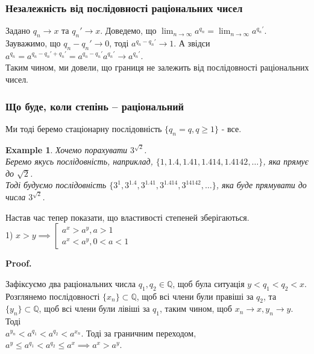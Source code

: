 \documentclass[a4paper, 14pt]{article}
\makeatletter
\def\qed{$\blacksquare$}
\theoremstyle{theoremdd}
\theoremstyle{theoremdd}
\theoremstyle{theoremdd}
\theoremstyle{theoremdd}
\newtheorem{example}[theorem]{Example}
\theoremstyle{theoremdd}
\theoremstyle{theoremdd}
\theoremstyle{theoremdd}
\theoremstyle{theoremdd}
\renewenvironment{proof}[1][Proof.\\]{\par
\pushQED{\hfill \qed}%
\normalfont \topsep6\p@\@plus6\p@\relax
\trivlist
\item\relax
{\bfseries
#1\@addpunct{.}}\hspace\labelsep\ignorespaces
}{%
\popQED\endtrivlist\@endpefalse
}
\makeatother
\begin{document}
\subsubsection*{Незалежність від послідовності раціональних чисел}
Задано $q_n \to x$ та $q_n' \to x$. Доведемо, що $\displaystyle\lim_{n \to \infty} a^{q_n} = \displaystyle\lim_{n \to \infty} a^{q_n'}$.\\
\iffalse
Зауважимо, що $q_n - q_n' \to 0$, тоді для $\varepsilon = 1: \exists N: \forall n \geq N: |q_n-q_n'| < 1$.\\
Тоді $|a^{q_n} - a^{q_n'}| = a^{q_n'}|a^{q_n-q_n'}-1| \leq a^{q_n'} 2|q_n-q_n'|(a-1) \overset{n \to \infty}{\longrightarrow} 0$.\\
Отже, дійсно,  $\displaystyle\lim_{n \to \infty} a^{q_n} = \displaystyle\lim_{n \to \infty} a^{q_n'}$, що підтверджує незалежність.
\fi
Зауважимо, що $q_n - q_n' \to 0$, тоді $a^{q_n - q_n'} \to 1$. А звідси $a^{q_n} = a^{q_n - q_n' + q_n'} = a^{q_n - q_n'} a^{q_n'} \to a^{q_n'}$.\\
Таким чином, ми довели, що границя не залежить від послідовності раціональних чисел.

\subsubsection*{Що буде, коли степінь -- раціональний}
Ми тоді беремо стаціонарну послідовність $\{q_n = q, q \geq 1\}$ - все.

\begin{example}
Хочемо порахувати $3^{\sqrt{2}}$. \\ Беремо якусь послідовність, наприклад, $\{1,1.4,1.41,1.414,1.4142,\dots\}$, яка прямує до $\sqrt{2}$.\\
Тоді будуємо послідовність $\{3^1,3^{1.4},3^{1.41},3^{1.414},3^{14142},\dots\}$, яка буде прямувати до числа $3^{\sqrt{2}}$.
\\
\end{example}

Настав час тепер показати, що властивості степеней зберігаються.\\
1) $x > y \implies \left[ \begin{gathered} a^{x} > a^{y}, a>1 \\ a^{x} < a^{y}, 0<a<1 \end{gathered} \right.$
\begin{proof}
Зафіксуємо два раціональних числа $q_1,q_2 \in \mathbb{Q}$, щоб була ситуація $y < q_1 < q_2 < x$.\\
Розглянемо послідовності $\{x_n\} \subset \mathbb{Q}$, щоб всі члени були правіші за $q_2$, та $\{y_n\} \subset \mathbb{Q}$, щоб всі члени були лівіші за $q_1$, таким чином, щоб $x_n \to x, y_n \to y$. Тоді\\
$a^{y_n} < a^{q_1} < a^{q_2} < a^{x_n}$. Тоді за граничним переходом, $a^y \leq a^{q_1} < a^{q_2} \leq a^x \implies a^x > a^y$.
\end{proof}
\end{document}
